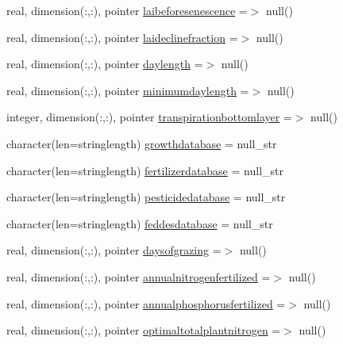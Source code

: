 \begin{DoxyCompactItemize}
\item 
real, dimension(\+:,\+:), pointer \mbox{\hyperlink{structmodulevegetation_1_1t__vegetation_a8b74d00c585865a20ebbdcea84235e1c}{laibeforesenescence}} =$>$ null()
\item 
real, dimension(\+:,\+:), pointer \mbox{\hyperlink{structmodulevegetation_1_1t__vegetation_a8f07e0f1a7cd944811c455d330b8a085}{laideclinefraction}} =$>$ null()
\item 
real, dimension(\+:,\+:), pointer \mbox{\hyperlink{structmodulevegetation_1_1t__vegetation_abeab1b6c889f0796f3c2da06eb28d1dc}{daylength}} =$>$ null()
\item 
real, dimension(\+:,\+:), pointer \mbox{\hyperlink{structmodulevegetation_1_1t__vegetation_a9ce08665c265ecdd0698487a65fd8ff4}{minimumdaylength}} =$>$ null()
\item 
integer, dimension(\+:,\+:), pointer \mbox{\hyperlink{structmodulevegetation_1_1t__vegetation_ab95c7702f1e80a8384bb7812e616d0fa}{transpirationbottomlayer}} =$>$ null()
\item 
character(len=stringlength) \mbox{\hyperlink{structmodulevegetation_1_1t__vegetation_aef255aa72bbf5f48cdce2fdeb4379a97}{growthdatabase}} = null\+\_\+str
\item 
character(len=stringlength) \mbox{\hyperlink{structmodulevegetation_1_1t__vegetation_aace36639334e48cae24172ba4d454faa}{fertilizerdatabase}} = null\+\_\+str
\item 
character(len=stringlength) \mbox{\hyperlink{structmodulevegetation_1_1t__vegetation_a98924b9e8385f23154037481b0842c6f}{pesticidedatabase}} = null\+\_\+str
\item 
character(len=stringlength) \mbox{\hyperlink{structmodulevegetation_1_1t__vegetation_ab18a314a11a41c099571c954ff91afdb}{feddesdatabase}} = null\+\_\+str
\item 
real, dimension(\+:,\+:), pointer \mbox{\hyperlink{structmodulevegetation_1_1t__vegetation_afe05f1c77f71fbfb827ca270ad909c05}{daysofgrazing}} =$>$ null()
\item 
real, dimension(\+:,\+:), pointer \mbox{\hyperlink{structmodulevegetation_1_1t__vegetation_a525e57ee6dd7168613dc2e4d22379643}{annualnitrogenfertilized}} =$>$ null()
\item 
real, dimension(\+:,\+:), pointer \mbox{\hyperlink{structmodulevegetation_1_1t__vegetation_a6c6d79a7554c6e13de18c54370a5311b}{annualphosphorusfertilized}} =$>$ null()
\item 
real, dimension(\+:,\+:), pointer \mbox{\hyperlink{structmodulevegetation_1_1t__vegetation_ad7f8c7383406c351b2c7eabc4d96752e}{optimaltotalplantnitrogen}} =$>$ null()

\end{DoxyCompactItemize}
